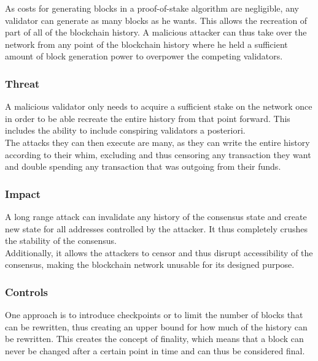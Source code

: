 \documentclass[11pt,a4paper,draft]{article}
\begin{document}
As costs for generating blocks in a proof-of-stake algorithm are negligible, any validator can generate as many blocks as he wants. This allows the recreation of part of all of the blockchain history. A malicious attacker can thus take over the network from any point of the blockchain history where he held a sufficient amount of block generation power to overpower the competing validators.\\

\subsubsection{Threat}

A malicious validator only needs to acquire a sufficient stake on the network once in order to be able recreate the entire history from that point forward. This includes the ability to include conspiring validators a posteriori.\\

The attacks they can then execute are many, as they can write the entire history according to their whim, excluding and thus censoring any transaction they want and double spending any transaction that was outgoing from their funds.\\

\subsubsection{Impact}

A long range attack can invalidate any history of the consensus state and create new state for all addresses controlled by the attacker. It thus completely crushes the stability of the consensus.\\

Additionally, it allows the attackers to censor and thus disrupt accessibility of the consensus, making the blockchain network unusable for its designed purpose.\\

\subsubsection{Controls}

One approach is to introduce checkpoints or to limit the number of blocks that can be rewritten, thus creating an upper bound for how much of the history can be rewritten. This creates the concept of finality, which means that a block can never be changed after a certain point in time and can thus be considered final.\\
\end{document}
